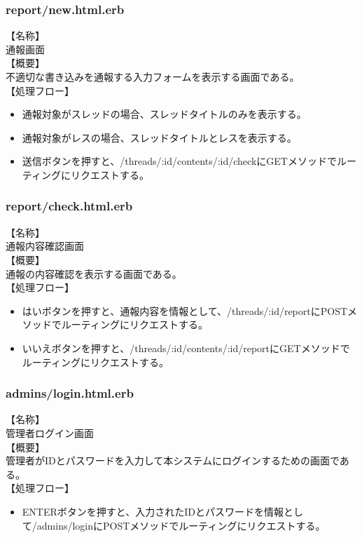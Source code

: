 \documentclass[a4j]{jarticle}
\begin{document}
\subsubsection{report/new.html.erb}
\noindent
【名称】\\
通報画面\\
【概要】\\
不適切な書き込みを通報する入力フォームを表示する画面である。\\
【処理フロー】
\begin{itemize}
  \item 通報対象がスレッドの場合、スレッドタイトルのみを表示する。
  \item 通報対象がレスの場合、スレッドタイトルとレスを表示する。
  \item 送信ボタンを押すと、/threads/:id/contents/:id/checkにGETメソッドでルーティングにリクエストする。
\end{itemize}

\subsubsection{report/check.html.erb}
\noindent
【名称】\\
通報内容確認画面\\
【概要】\\
通報の内容確認を表示する画面である。\\
【処理フロー】
\begin{itemize}
  \item はいボタンを押すと、通報内容を情報として、/threads/:id/reportにPOSTメソッドでルーティングにリクエストする。
  \item いいえボタンを押すと、/threads/:id/contents/:id/reportにGETメソッドでルーティングにリクエストする。
\end{itemize}

\subsubsection{admins/login.html.erb}
\noindent
【名称】\\
管理者ログイン画面\\
【概要】\\
管理者がIDとパスワードを入力して本システムにログインするための画面である。\\
【処理フロー】
\begin{itemize}
  \item ENTERボタンを押すと、入力されたIDとパスワードを情報として/admins/loginにPOSTメソッドでルーティングにリクエストする。
\end{itemize}
\end{document}
